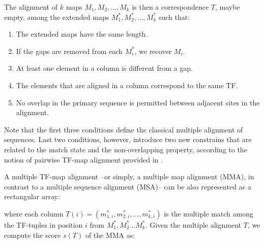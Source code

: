 The alignment of $k$ maps $M_1,M_2,\ldots,M_k$ is then a correspondence $T$, maybe empty,
among the extended maps $M_1^*,M_2^*,\ldots,M_k^*$ such that:

\begin{enumerate}
\item
The extended maps have the same length.
\item 
If the gaps are removed from each $M_i^*$, we recover $M_i$.
\item
At least one element in a column is different from a gap.
\item
The elements that are aligned in a column correspond to the same TF.
\item
No overlap in the primary sequence is permitted between adjacent sites 
in the alignment.
\end{enumerate}

Note that the first three conditions define the classical multiple alignment 
of sequences. Last two conditions, however, introduce two new constrains that 
are related to the match state and the non-overlapping property, according to the 
notion of pairwise TF-map alignment provided in \citep{blanco:2006b}.



A multiple TF-map alignment --or simply, a multiple map alignment (MMA),
in contrast to a multiple sequence alignment (MSA)--
can be also represented as a rectangular array:

\begin{center}
\end{center}

\noindent where each column $T(i)= (m_{1,i}^*,m_{2,i}^*,\ldots,m_{k,i}^*)$
is the multiple match among the TF-tuples in position $i$ from 
$M_1^*, M_2^* \ldots M_k^*$. Given the multiple alignment $T$, we compute the 
score $s(T)$ of the MMA as:

